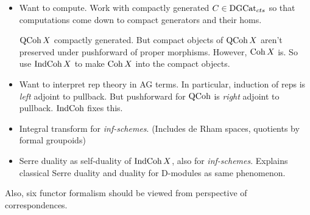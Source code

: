 \documentclass[./main.tex]{subfiles}
\begin{document}
  
\begin{itemize}
  \item Want to compute. 
  Work with compactly generated $C \in \mathrm{DGCat}_{cts}$ so that
  computations come down to compact generators and their homs.
  
  $\mathrm{QCoh}\,X$ compactly generated.
  But compact objects of $\mathrm{QCoh}\,X$ aren't preserved under
  pushforward of proper morphisms. 
  However, $\mathrm{Coh}\, X$ is.
  So use $\mathrm{IndCoh}\,X$ to make $\mathrm{Coh}\,X$ into the compact objects.
  \item Want to interpret rep theory in AG terms.
  In particular, induction of reps is \emph{left} adjoint to pullback.
  But pushforward for $\mathrm{QCoh}$ is \emph{right} adjoint to pullback.
  $\mathrm{IndCoh}$ fixes this.

  \item Integral transform for \emph{inf-schemes}.
  (Includes de Rham spaces, quotients by formal groupoids)

  \item Serre duality as self-duality of $\mathrm{IndCoh}\,X$,
  also for \emph{inf-schemes}.
  Explains classical Serre duality and duality for D-modules
  as same phenomenon.
\end{itemize}

Also, six functor formalism should be viewed from
perspective of correspondences.
\end{document}
